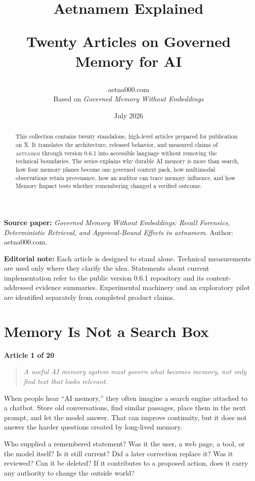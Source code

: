\documentclass[11pt]{article}
\title{\vspace{-1.4em}\textbf{Aetnamem Explained}\par
\large Twenty Articles on Governed Memory for AI}
\author{aetna000.com\\
\small Based on \emph{Governed Memory Without Embeddings}}
\date{July 2026}
\newcommand{\system}{\textsc{aetnamem}}
\newcommand{\articlelabel}[1]{%
  \noindent\colorbox{aetnaTeal!10}{%
    \parbox{0.96\textwidth}{\color{aetnaInk}\small\textbf{Article #1 of 20}}}%
  \par\medskip}
\newcommand{\coreidea}[1]{%
  \begin{quote}\color{aetnaTeal}\large\itshape #1\end{quote}}
\begin{document}
\maketitle

\begin{abstract}
This collection contains twenty standalone, high-level articles prepared for
publication on X. It translates the architecture, released behavior, and
measured claims of \system{} through version 0.6.1 into accessible language
without removing the technical boundaries. The series explains why durable AI
memory is more than search, how four memory planes become one governed context
pack, how multimodal observations retain provenance, how an auditor can trace
memory influence, and how Memory Impact tests whether remembering changed a
verified outcome.
\end{abstract}

\noindent\textbf{Source paper:}
\emph{Governed Memory Without Embeddings: Recall Forensics, Deterministic
Retrieval, and Approval-Bound Effects in aetnamem}. Author: aetna000.com.

\noindent\textbf{Editorial note:} Each article is designed to stand alone.
Technical measurements are used only where they clarify the idea. Statements
about current implementation refer to the public version 0.6.1 repository and
its content-addressed evidence summaries. Experimental machinery and an
exploratory pilot are identified separately from completed product claims.

\tableofcontents
\clearpage

\section{Memory Is Not a Search Box}
\articlelabel{1}
\coreidea{A useful AI memory system must govern what becomes memory, not only
find text that looks relevant.}

When people hear ``AI memory,'' they often imagine a search engine attached to
a chatbot. Store old conversations, find similar passages, place them in the
next prompt, and let the model answer. That can improve continuity, but it
does not answer the harder questions created by long-lived memory.

Who supplied a remembered statement? Was it the user, a web page, a tool, or
the model itself? Is it still current? Did a later correction replace it? Was
it reviewed? Can it be deleted? If it contributes to a proposed action, does
it carry any authority to change the outside world?
\end{document}
